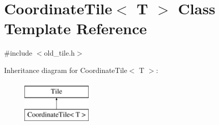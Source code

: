 \hypertarget{classCoordinateTile}{}\section{Coordinate\+Tile$<$ T $>$ Class Template Reference}
\label{classCoordinateTile}


{\ttfamily \#include $<$old\+\_\+tile.\+h$>$}

Inheritance diagram for Coordinate\+Tile$<$ T $>$\+:\begin{figure}[H]
\begin{center}
\leavevmode
\includegraphics[height=2.000000cm]{classCoordinateTile}
\end{center}
\end{figure}
